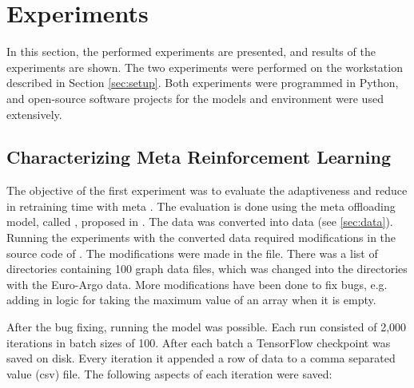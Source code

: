 \chapter{Experiments}\label{sec:experiments}

In this section, the performed experiments are presented, and results of the
experiments are shown. The two experiments were performed on the workstation
described in Section \ref{sec:setup}. Both experiments were programmed in
Python, and open-source software projects for the models and environment were
used extensively.

\section{Characterizing Meta Reinforcement Learning}

The objective of the first experiment was to evaluate the adaptiveness and
reduce in retraining time with meta \rl. The evaluation is done using the meta
\rl offloading model, called \mrlco, proposed in . The data
was converted into \DAG data (see \ref{sec:data}). Running the experiments
with the converted data required modifications in the source code of \mrlco.
The modifications were made in the  file. There was a
list of directories containing 100 graph data files, which was changed into the
directories with the Euro-Argo data. More modifications have been done to fix
bugs, e.g. adding in logic for taking the maximum value of an array when it is
empty.

After the bug fixing, running the model was possible. Each run consisted of
2,000 iterations in batch sizes of 100. After each batch a TensorFlow
checkpoint was saved on disk. Every iteration it appended a row of data to a
comma separated value (csv) file. The following aspects of each iteration were
saved:

